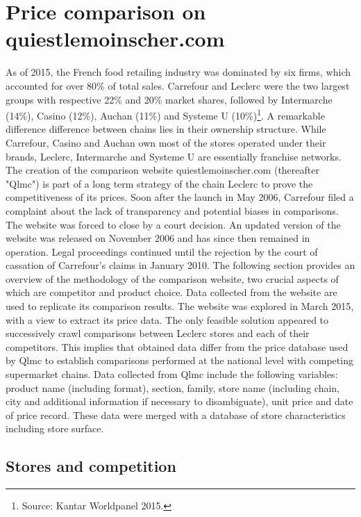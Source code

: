 \documentclass[english]{article}
\begin{document}
\section{Price comparison on quiestlemoinscher.com}

As of 2015, the French food retailing industry was dominated by six firms, which accounted for over 80\% of total sales. Carrefour and Leclerc were the two largest groups with respective 22\% and 20\% market shares, followed by Intermarche (14\%), Casino (12\%), Auchan (11\%) and Systeme U (10\%)\footnote{Source: Kantar Worldpanel 2015.}. A remarkable difference difference between chains lies in their ownership structure. While Carrefour, Casino and Auchan own most of the stores operated under their brands, Leclerc, Intermarche and Systeme U are essentially franchise networks. The creation of the comparison website quiestlemoinscher.com (thereafter "Qlmc") is part of a long term strategy of the chain Leclerc to prove the competitiveness of its prices. Soon after the launch in May 2006, Carrefour filed a complaint about the lack of transparency and potential biases in comparisons. The website was forced to close by a court decision. An updated version of the website was released on November 2006 and has since then remained in operation. Legal proceedings continued until the rejection by the court of cassation of Carrefour's claims in January 2010. The following section provides an overview of the methodology of the comparison website, two crucial aspects of which are competitor and product choice. Data collected from the website are used to replicate its comparison results. The website was explored in March 2015, with a view to extract its price data. The only feasible solution appeared to successively crawl comparisons between Leclerc stores and each of their competitors. This implies that obtained data differ from the price database used by Qlmc to establish comparisons performed at the national level with competing supermarket chains. Data collected from Qlmc include the following variables: product name (including format), section, family, store name (including chain, city and additional information if necessary to disambiguate), unit price and date of price record. These data were merged with a database of store characteristics including store surface.


\subsection{Stores and competition}
\end{document}
